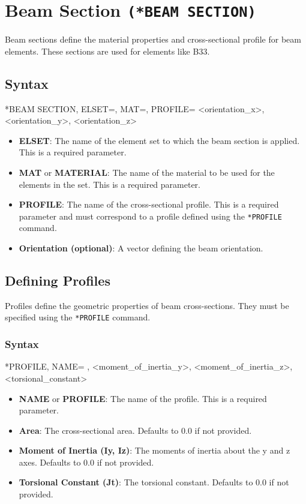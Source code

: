 \section{Beam Section \texttt{(*BEAM SECTION)}}
Beam sections define the material properties and cross-sectional profile for beam elements. These sections are used for elements like B33.

\subsection{Syntax}
\begin{codeBlock}
*BEAM SECTION, ELSET=, MAT=, PROFILE=
<orientation_x>, <orientation_y>, <orientation_z>
\end{codeBlock}

\begin{itemize}
\item \textbf{ELSET}: The name of the element set to which the beam section is applied. This is a required parameter.
\item \textbf{MAT} or \textbf{MATERIAL}: The name of the material to be used for the elements in the set. This is a required parameter.
\item \textbf{PROFILE}: The name of the cross-sectional profile. This is a required parameter and must correspond to a profile defined using the \texttt{*PROFILE} command.
\item \textbf{Orientation (optional)}: A vector  defining the beam orientation.
\end{itemize}

\subsection{Defining Profiles}
Profiles define the geometric properties of beam cross-sections. They must be specified using the \texttt{*PROFILE} command.

\subsubsection{Syntax}
\begin{codeBlock}
*PROFILE, NAME=
, <moment_of_inertia_y>, <moment_of_inertia_z>, <torsional_constant>
\end{codeBlock}

\begin{itemize}
\item \textbf{NAME} or \textbf{PROFILE}: The name of the profile. This is a required parameter.
\item \textbf{Area}: The cross-sectional area. Defaults to 0.0 if not provided.
\item \textbf{Moment of Inertia (Iy, Iz)}: The moments of inertia about the y and z axes. Defaults to 0.0 if not provided.
\item \textbf{Torsional Constant (Jt)}: The torsional constant. Defaults to 0.0 if not provided.
\end{itemize}





